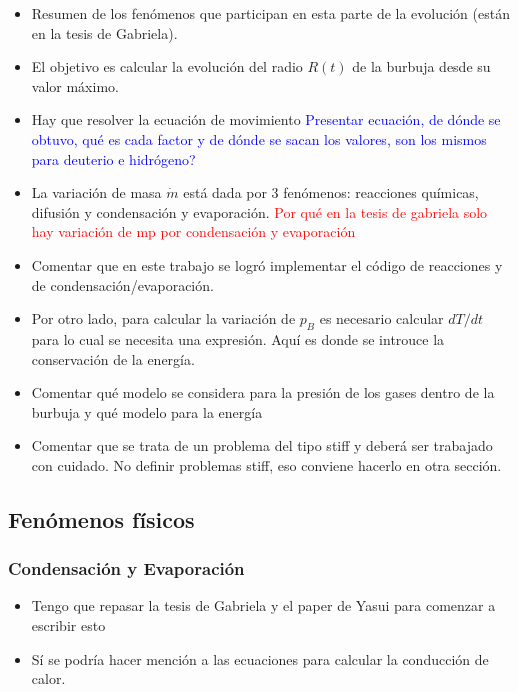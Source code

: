 \documentclass[aps,prb,twocolumn,superscriptaddress,floatfix,longbibliography,10pt]{revtex4-2}
\newcounter{para}
\begin{document}
\begin{itemize}
  \item Resumen de los fenómenos que participan en esta parte de la evolución (están en la tesis de Gabriela).
  \item El objetivo es calcular la evolución del radio $R(t)$ de la burbuja desde su valor máximo.
  \item Hay que resolver la ecuación de movimiento \textcolor{blue}{Presentar ecuación, de dónde se obtuvo, qué es cada factor y de dónde se sacan los valores, son los mismos para deuterio e hidrógeno?}
  \item La variación de masa $\dot{m}$ está dada por 3 fenómenos: reacciones químicas, difusión y condensación y evaporación. \textcolor{red}{Por qué en la tesis de gabriela solo hay variación de mp por condensación y evaporación}
  \item Comentar que en este trabajo se logró implementar el código de reacciones y de condensación/evaporación.
  \item Por otro lado, para calcular la variación de $p_B$ es necesario calcular $dT/dt$ para lo cual se necesita una expresión. Aquí es donde se introuce la conservación de la energía.
  \item Comentar qué modelo se considera para la presión de los gases dentro de la burbuja y qué modelo para la energía
  \item Comentar que se trata de un problema del tipo stiff y deberá ser trabajado con cuidado. No definir problemas stiff, eso conviene hacerlo en otra sección.
\end{itemize}

\subsection{Fenómenos físicos}




\subsubsection{Condensación y Evaporación}

\begin{itemize}
  \item Tengo que repasar la tesis de Gabriela y el paper de Yasui para comenzar a escribir esto
  \item Sí se podría hacer mención a las ecuaciones para calcular la conducción de calor.
\end{itemize}
\end{document}
